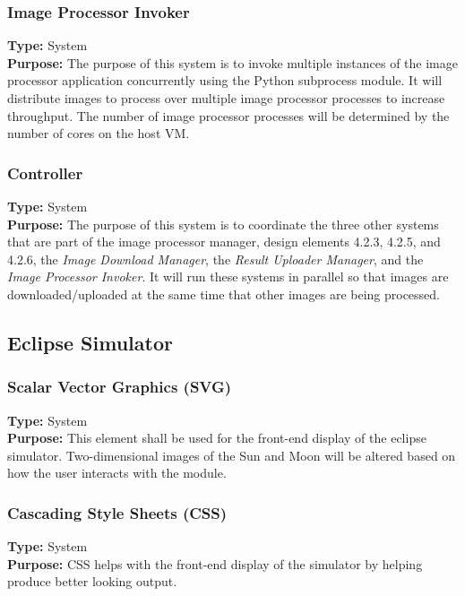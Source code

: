 \documentclass[10pt, onecolumn, draftclsnofoot, letterpaper, compsoc]{IEEEtran}
\begin{document}
    \subsubsection{Image Processor Invoker}
    \textbf{Type:} System \\
    \textbf{Purpose:} The purpose of this system is to invoke multiple instances of the image processor
    application concurrently using the Python subprocess module. It will distribute images to process over
    multiple image processor processes to increase throughput. The number of image processor processes will be
    determined by the number of cores on the host VM. \\

    \subsubsection{Controller}
    \textbf{Type:} System \\
    \textbf{Purpose:} The purpose of this system is to coordinate the three other systems that are part of the
    image processor manager, design elements 4.2.3, 4.2.5, and 4.2.6, the \textit{Image Download Manager},
    the \textit{Result Uploader Manager}, and the \textit{Image Processor Invoker}. It will run these systems
    in parallel so that images are downloaded/uploaded at the same time that other images are being
    processed. \\


\subsection{Eclipse Simulator}

  \subsubsection{Scalar Vector Graphics (SVG)}
  \textbf{Type:} System \\
  \textbf{Purpose:} This element shall be used for the
  front-end display of the eclipse simulator.
  Two-dimensional images of the Sun and Moon will be altered
  based on how the user interacts with the module.


  \subsubsection{Cascading Style Sheets (CSS)}
  \textbf{Type:} System \\
  \textbf{Purpose:} CSS helps with the front-end display of
  the simulator by helping produce better looking output.
\end{document}
